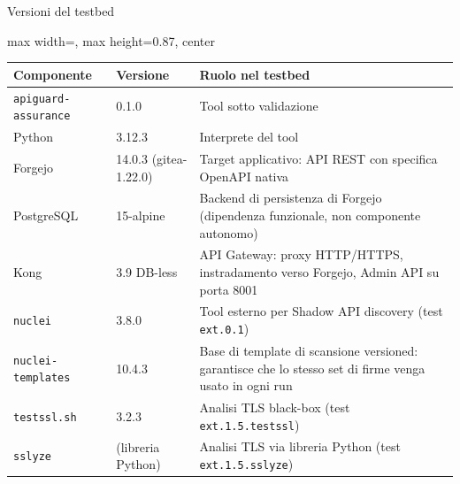 \begin{frame}{Versioni del testbed}
  \scriptsize
  \renewcommand{\arraystretch}{0.85}
  \begin{adjustbox}{max width=\textwidth, max height=0.87\textheight, center}
    \begin{tabularx}{\textwidth}{@{} l l >{\raggedright\arraybackslash}X @{}}
      \toprule
      \textbf{Componente}         & \textbf{Versione}     & \textbf{Ruolo nel testbed}                                                                             \\
      \midrule
      \texttt{apiguard-assurance} & 0.1.0                 & Tool sotto validazione                                                                                 \\
      Python                      & 3.12.3                & Interprete del tool                                                                                    \\
      Forgejo                     & 14.0.3 (gitea-1.22.0) & Target applicativo: API REST con specifica OpenAPI nativa                                              \\
      PostgreSQL                  & 15-alpine             & Backend di persistenza di Forgejo (dipendenza funzionale, non componente autonomo)                     \\
      Kong                        & 3.9 DB-less           & API Gateway: proxy HTTP/HTTPS, instradamento verso Forgejo, Admin API su porta 8001                    \\
      \texttt{nuclei}             & 3.8.0                 & Tool esterno per Shadow API discovery (test \texttt{ext.0.1})                                          \\
      \texttt{nuclei-templates}   & 10.4.3                & Base di template di scansione versioned: garantisce che lo stesso set di firme venga usato in ogni run \\
      \texttt{testssl.sh}         & 3.2.3                 & Analisi TLS black-box (test \texttt{ext.1.5.testssl})                                                  \\
      \texttt{sslyze}             & (libreria Python)     & Analisi TLS via libreria Python (test \texttt{ext.1.5.sslyze})                                         \\
      \bottomrule
    \end{tabularx}
  \end{adjustbox}
\end{frame}

